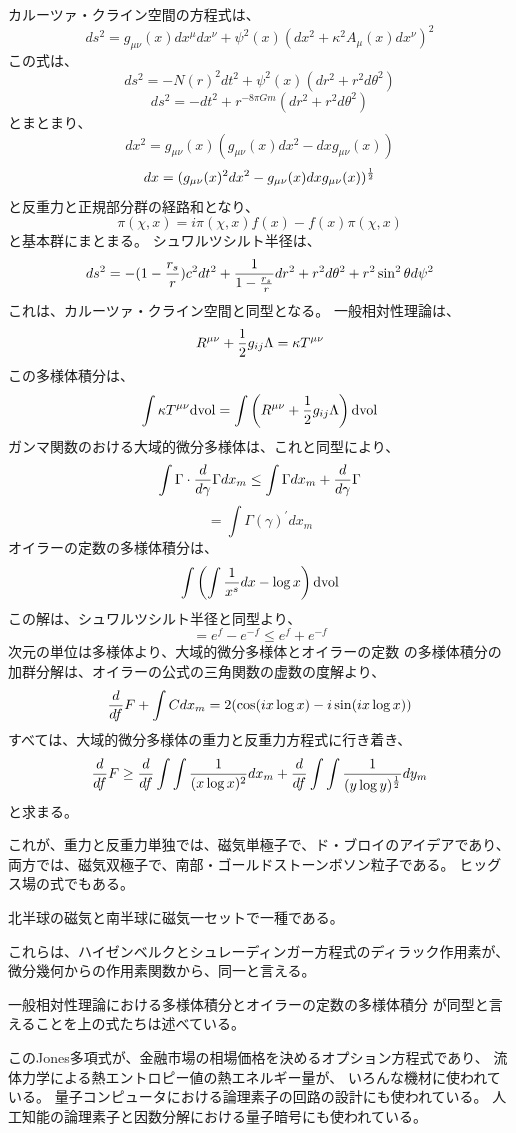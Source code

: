 \documentclass{jsarticle}
\begin{document}
    カルーツァ・クライン空間の方程式は、
    $$ ds^2 = g_{\mu\nu}(x)dx^{\mu}dx^{\nu} + \psi^2(x)(dx^2 + \kappa^2
    A_{\mu}(x)dx^{\nu})^2 $$
    この式は、
    $$ ds^2 = -N(r)^2dt^2 + \psi^2(x)(dr^2 + r^2d\theta^2) $$
    $$ ds^2 = -dt^2 + r^{-8\pi Gm}(dr^2 + r^2d\theta^2) $$
    とまとまり、
    $$ dx^2 = g_{\mu\nu}(x)(g_{\mu\nu}(x)dx^2 - dxg_{\mu\nu}(x)) $$
    $$ dx = (g_{\mu\nu}(x)^2dx^2 - g_{\mu\nu}(x)dx g_{\mu\nu}(x))^{1 \over 2} $$
    と反重力と正規部分群の経路和となり、　
    $$ \pi(\chi, x) = i \pi (\chi, x)f(x) - f(x)  \pi (\chi, x) $$
    と基本群にまとまる。
    シュワルツシルト半径は、
    $$ ds^2 = -(1 - {r_s \over r})c^2 dt^2 + {1 \over {{1 - {r_s \over r}}}} 
    dr^2 + r^2 d \theta^2 + r^2 \sin^2 \theta d \psi^2 $$
    これは、カルーツァ・クライン空間と同型となる。
    一般相対性理論は、
    $$ R^{\mu\nu} + {1 \over 2}g_{ij}\Lambda = \kappa T^{\mu\nu} $$
    この多様体積分は、
    $$ \int \kappa T^{\mu\nu}\mathrm{dvol} = \int  \left(R^{\mu\nu} + 
    {1 \over 2}g_{ij}\Lambda\right)\mathrm{dvol}  $$
    ガンマ関数のおける大域的微分多様体は、これと同型により、
    $$ \int \Gamma \cdot {d \over {d \gamma}}{\Gamma dx_m} \le \int \Gamma
    dx_m + {d \over d \gamma}\Gamma $$
    $$ = \int \Gamma(\gamma)^{'}dx_m $$
    オイラーの定数の多様体積分は、
    $$ \int \left({{\int {1 \over x^s}}dx - \log x} \right)\mathrm{dvol} $$
    この解は、シュワルツシルト半径と同型より、
    $$ = e^f - e^{-f} \le {e^f + e^{-f}} $$
    次元の単位は多様体より、大域的微分多様体とオイラーの定数
    の多様体積分の加群分解は、オイラーの公式の三角関数の虚数の度解より、
    $$ {d \over df}F + \int C dx_m = 2 (\cos (i x \log x) 
    - i \sin (i x \log x)) $$
    すべては、大域的微分多様体の重力と反重力方程式に行き着き、
    $$ {d \over df}F \ge {d \over df}\int \int{1 \over (x \log x)^2}dx_m
    + {d \over df}\int \int{1 \over (y \log y)^{1 \over 2}}dy_m $$
    と求まる。

    これが、重力と反重力単独では、磁気単極子で、ド・ブロイのアイデアであり、
    両方では、磁気双極子で、南部・ゴールドストーンボソン粒子である。
    ヒッグス場の式でもある。

    北半球の磁気と南半球に磁気一セットで一種である。

    これらは、ハイゼンベルクとシュレーディンガー方程式のディラック作用素が、
    微分幾何からの作用素関数から、同一と言える。

    
    一般相対性理論における多様体積分とオイラーの定数の多様体積分
    が同型と言えることを上の式たちは述べている。

    このJones多項式が、金融市場の相場価格を決めるオプション方程式であり、
    流体力学による熱エントロピー値の熱エネルギー量が、
    いろんな機材に使われている。
    量子コンピュータにおける論理素子の回路の設計にも使われている。
    人工知能の論理素子と因数分解における量子暗号にも使われている。
\end{document}
